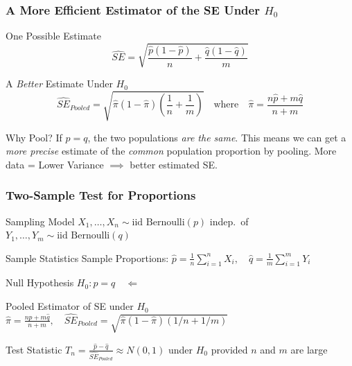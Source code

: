 \documentclass[handout]{beamer}
\begin{document}
\begin{frame}
	\frametitle{A More Efficient Estimator of the SE Under $H_0$}
	\begin{block}
		{One Possible Estimate}
	$$\widehat{SE} = \sqrt{\frac{\widehat{p}(1-\widehat{p})}{n} + \frac{\widehat{q}(1-\widehat{q})}{m}}$$
	\end{block}
	\begin{block}
		{A \emph{Better} Estimate Under $H_0$}
		$$\widehat{SE}_{Pooled} = \sqrt{\widehat{\pi}(1-\widehat{\pi})\left( \frac{1}{n} + \frac{1}{m} \right) } \quad \mbox{where}\quad \widehat{\pi} = \displaystyle \frac{n \widehat{p} + m \widehat{q}}{n + m}$$
	\end{block}
	\begin{alertblock}
		{Why Pool?}
		If $p = q$, the two populations \emph{are the same}. This means we can get a \emph{more precise} estimate of the \emph{common} population proportion by pooling. More data = Lower Variance $\implies$ better estimated SE.
	\end{alertblock}
\end{frame}
\begin{frame}
	\frametitle{Two-Sample Test for Proportions}
	\begin{block}
		{Sampling Model}
		\small
		$X_1, \hdots, X_n \sim \mbox{iid Bernoulli}(p)$ indep.\  of $Y_1, \hdots, Y_m \sim \mbox{iid Bernoulli}(q)$
	\end{block}
	\begin{block}
		{Sample Statistics}
			Sample Proportions: $\displaystyle\widehat{p} = \frac{1}{n}\sum_{i=1}^{n} X_i, \quad\displaystyle\widehat{q} = \frac{1}{m}\sum_{i=1}^{m} Y_i$
	\end{block}
	\begin{block}
		{Null Hypothesis}
		$H_0\colon p = q \quad \Leftarrow \; $\fbox{ i.e.\ $p - q = 0$}
	\end{block}
	\begin{block}
		{Pooled Estimator of SE under $H_0$}
		$\widehat{\pi} = \displaystyle \frac{n \widehat{p} + m \widehat{q}}{n + m}, \quad \widehat{SE}_{Pooled} = \sqrt{\widehat{\pi}(1-\widehat{\pi})\left( 1/n + 1/m \right) }$
	\end{block}
	\begin{block}
		{Test Statistic}
		$\displaystyle T_n = \frac{\widehat{p}- \widehat{q}}{\widehat{SE}_{Pooled}} \approx N(0,1)$ under $H_0$ provided $n$ and $m$ are large
	\end{block}
\end{frame}
\end{document}
